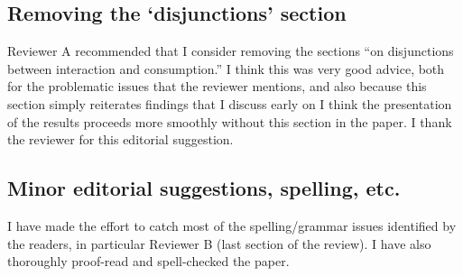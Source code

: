 \documentclass[11pt]{article}
\begin{document}
\subsection*{Removing the `disjunctions' section}
Reviewer A recommended that I consider removing the sections ``on disjunctions between interaction and consumption.'' I think this was very good advice, both for the problematic issues that the reviewer mentions, and also because this section simply reiterates findings that I discuss early on  I think the presentation of the results proceeds more smoothly without this section in the paper.  I thank the reviewer for this editorial suggestion. 

\subsection*{Minor editorial suggestions, spelling, etc.}
I have made the effort to catch most of the spelling/grammar issues identified by the readers, in particular Reviewer B (last section of the review). I have also thoroughly proof-read and spell-checked the paper.  
\end{document}
